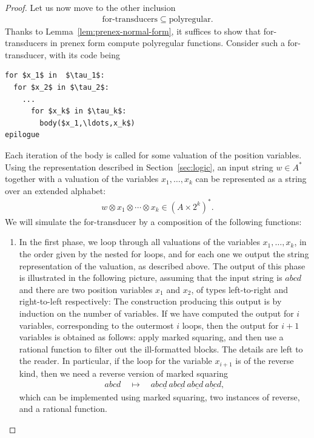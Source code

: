 \begin{proof}
Let us now move to the other inclusion
\begin{align*}
\text{for-transducers} \subseteq \text{polyregular}.
\end{align*}
Thanks to Lemma~\ref{lem:prenex-normal-form}, it suffices to show that for-transducers in prenex  form compute polyregular functions. Consider such a for-transducer, with its code being 
\begin{lstlisting}
for $x_1$ in  $\tau_1$:
  for $x_2$ in $\tau_2$:
    ...
      for $x_k$ in $\tau_k$:
        body($x_1,\ldots,x_k$)
epilogue
\end{lstlisting}
Each iteration of the body is called for some valuation of the position variables. Using the representation described in Section~\ref{sec:logic}, an input string $w \in A^*$ together with a valuation of the variables $x_1,\ldots,x_k$ can be represented as a string over an extended alphabet:
\begin{align*}
w \otimes {x_1} \otimes \cdots \otimes {x_k} \in (A \times 2^k)^*.
\end{align*}
We will simulate the for-transducer by a composition of the following functions: 
\begin{enumerate}
  \item In the first phase, we loop through all  valuations of the  variables $x_1,\ldots,x_k$, in the order given by the nested for loops, and for each one we output the string representation of the valuation, as described above. The output of this phase is illustrated in the following picture, assuming that the input string is $abcd$ and there are two position variables $x_1$ and $x_2$, of types left-to-right and right-to-left respectively:
  The construction producing this output is by induction on the number of variables. If we have computed the output for $i$ variables, corresponding to the outermost $i$ loops, then the output for $i+1$ variables is obtained as follows: apply marked squaring, and then use a rational function to filter out the ill-formatted blocks. The details are left to the reader. In particular, if the loop for the variable $x_{i+1}$ is of the reverse kind, then we need a reverse version of marked squaring
  \begin{align*}
  abcd \quad \mapsto \quad abc\underline{d}\   ab\underline{cd}\   a\underline{bcd} \  \underline{abcd},
  \end{align*}
  which can be implemented using marked squaring, two instances of reverse, and a rational function.

\end{enumerate}
\end{proof}
